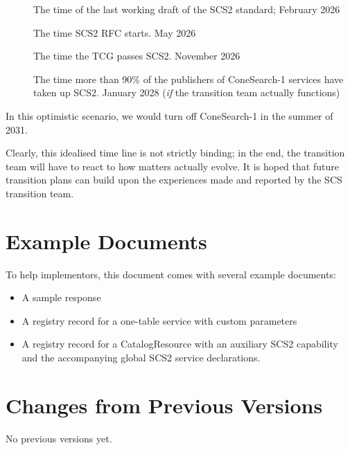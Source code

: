\documentclass[11pt,a4paper]{ivoa}
\begin{document}
\begin{description}
\item [] The time of the last working draft of the SCS2
standard; February 2026

\item[] The time SCS2 RFC starts.  May 2026

\item[] The time the TCG passes SCS2.  November 2026

\item[] The time more than 90\% of the publishers of
ConeSearch-1 services have taken up SCS2.  January 2028 (\textit{if} the
transition team actually functions)

\end{description}

In this optimistic scenario, we would turn off ConeSearch-1 in the
summer of 2031.

Clearly, this idealised time line is not strictly binding; in the end,
the transition team will have to react to how matters actually evolve.
It is hoped that future transition plans can build upon the experiences
made and reported by the SCS transition team.

\section{Example Documents}
\label{app:examples}

To help implementors, this document comes with several example documents:

\begin{itemize}
\item A sample response
\item A registry record for a one-table service with custom parameters
\item A registry record for a CatalogResource with an auxiliary SCS2
capability and the accompanying global SCS2 service declarations.
\end{itemize}

\section{Changes from Previous Versions}

No previous versions yet.



\end{document}
